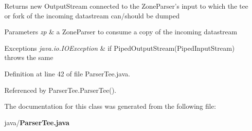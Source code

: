 \begin{DoxyReturn}{Returns}
new Output\-Stream connected to the Zone\-Parser's input to which the tee or fork of the incoming datastream can/should be dumped 
\end{DoxyReturn}

\begin{DoxyParams}{Parameters}
{\em zp} & a Zone\-Parser to consume a copy of the incoming datastream \\
\hline
\end{DoxyParams}

\begin{DoxyExceptions}{Exceptions}
{\em java.\-io.\-I\-O\-Exception} & if Piped\-Output\-Stream(\-Piped\-Input\-Stream) throws the same \\
\hline
\end{DoxyExceptions}


Definition at line 42 of file Parser\-Tee.\-java.



Referenced by Parser\-Tee.\-Parser\-Tee().



The documentation for this class was generated from the following file\-:\begin{DoxyCompactItemize}
\item 
java/{\bf Parser\-Tee.\-java}\end{DoxyCompactItemize}
